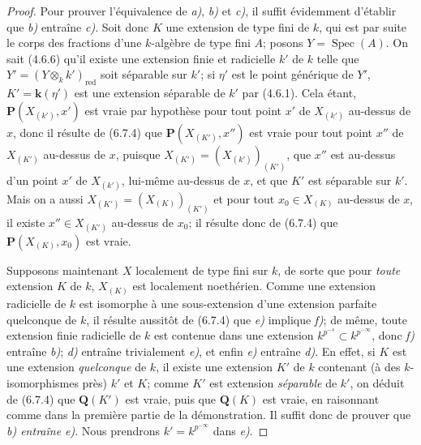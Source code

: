 \begin{proof}
Pour prouver l'équivalence de \emph{a)}, \emph{b)} et \emph{c)}, il suffit évidemment d'établir
que \emph{b)} entraîne \emph{c)}. Soit donc $K$ une extension de type fini de $k$, qui est
par suite le corps des fractions d'une $k$-algèbre de type fini $A$; posons
$Y=\operatorname{Spec}(A)$. On sait (4.6.6) qu'il existe une extension finie
et radicielle $k'$ de $k$ telle que $Y'=(Y\otimes_k k')_{\mathrm{red}}$ soit
séparable sur $k'$; si $\eta'$ est le point générique de $Y'$, $K'=\boldsymbol{k}(\eta')$
est une extension séparable de $k'$ par (4.6.1). Cela étant,
$\boldsymbol{P}(X_{(k')},x')$ est vraie par hypothèse pour tout point $x'$ de $X_{(k')}$
au-dessus de $x$, donc il résulte de (6.7.4) que $\boldsymbol{P}(X_{(K')},x'')$ est vraie
pour tout point $x''$ de $X_{(K')}$ au-dessus de $x$, puisque
$X_{(K')}=(X_{(k')})_{(K')}$, que $x''$ est au-dessus d'un point $x'$ de
$X_{(k')}$, lui-même au-dessus de $x$, et que $K'$ est séparable sur $k'$.
Mais on a aussi
$X_{(K')}=(X_{(K)})_{(K')}$ et pour tout $x_0\in X_{(K)}$ au-dessus de
$x$, il existe $x''\in X_{(K')}$ au-dessus de $x_0$; il résulte donc de
(6.7.4) que $\boldsymbol{P}(X_{(K)},x_0)$ est vraie.

Supposons maintenant $X$ localement de type fini sur $k$, de sorte que pour
\emph{toute} extension $K$ de $k$, $X_{(K)}$ est localement noethérien. Comme une
extension radicielle de $k$ est isomorphe à une sous-extension d'une extension
parfaite quelconque de $k$, il résulte aussitôt de (6.7.4) que \emph{e)} implique \emph{f)};
de même, toute extension finie radicielle de $k$ est contenue dans une
extension $k^{p^{-s}}\subset k^{p^{-\infty}}$, donc \emph{f)} entraîne \emph{b)}; \emph{d)} entraîne
trivialement \emph{e)}, et enfin \emph{e)} entraîne \emph{d)}. En effet, si $K$ est une extension
\emph{quelconque} de $k$,
il existe une extension $K'$ de $k$ contenant (à des $k$-isomorphismes près)
$k'$ et $K$; comme $K'$ est extension \emph{séparable} de $k'$, on déduit de (6.7.4)
que $\boldsymbol{Q}(K')$ est vraie, puis que $\boldsymbol{Q}(K)$ est vraie, en raisonnant comme dans la
première partie de la démonstration. Il suffit donc de prouver que \emph{b) entraîne
e)}. Nous prendrons $k'=k^{p^{-\infty}}$ dans \emph{e)}.


\end{proof}
